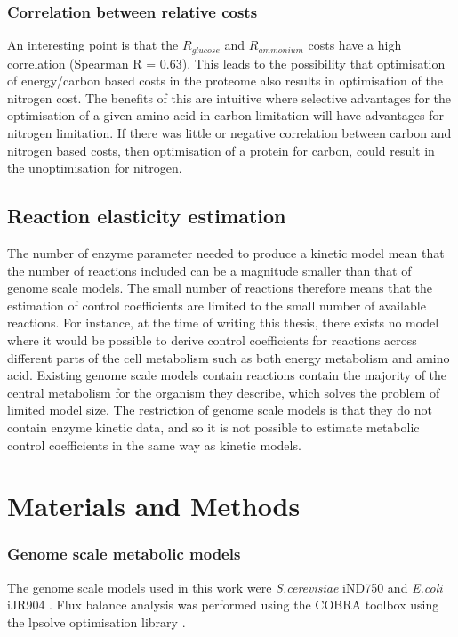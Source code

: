 \subsubsection{Correlation between relative costs}

An interesting point is that the $R_{glucose}$ and $R_{ammonium}$ costs have a high correlation (Spearman R = 0.63). This leads to the possibility that optimisation of energy/carbon based costs in the proteome also results in optimisation of the nitrogen cost. The benefits of this are intuitive where selective advantages for the optimisation of a given amino acid in carbon limitation will have advantages for nitrogen limitation. If there was little or negative correlation between carbon and nitrogen based costs, then optimisation of a protein for carbon, could result in the unoptimisation for nitrogen.

\subsection{Reaction elasticity estimation}

The number of enzyme parameter needed to produce a kinetic model mean that the number of reactions included can be a magnitude smaller than that of genome scale models. The small number of reactions therefore means that the estimation of  control coefficients are limited to the small number of available reactions. For instance, at the time of writing this thesis, there exists no model where it would be possible to derive control coefficients for reactions across different parts of the cell metabolism such as both energy metabolism and amino acid. Existing genome scale models contain reactions contain the majority of the central metabolism for the organism they describe, which solves the problem of limited model size. The restriction of genome scale models is that they do not contain enzyme kinetic data, and so it is not possible to estimate metabolic control coefficients in the same way as kinetic models.

\section{Materials and Methods}

\subsubsection{Genome scale metabolic models}

The genome scale models used in this work were \emph{S.cerevisiae} iND750 \cite{duarte2004a} and \emph{E.coli} iJR904 \cite{reed2003}. Flux balance analysis was performed using the COBRA toolbox \cite{becker2007} using the lpsolve optimisation library \cite{lpsolve}.

